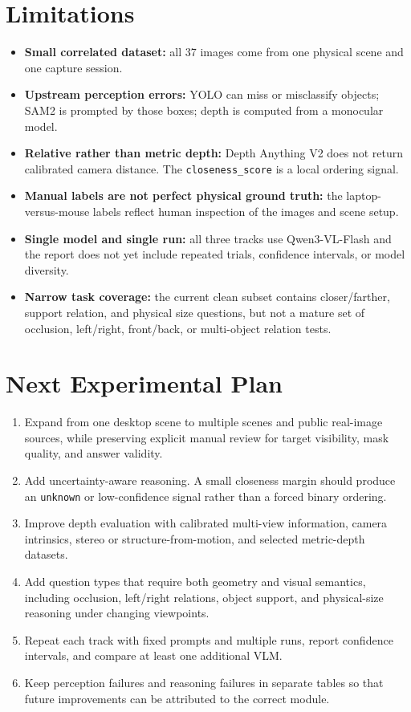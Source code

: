 \documentclass[11pt]{article}
\begin{document}
\section{Limitations}
\begin{itemize}[leftmargin=18pt,itemsep=2pt]
    \item \textbf{Small correlated dataset:} all 37 images come from one physical scene and one capture session.
    \item \textbf{Upstream perception errors:} YOLO can miss or misclassify objects; SAM2 is prompted by those boxes; depth is computed from a monocular model.
    \item \textbf{Relative rather than metric depth:} Depth Anything V2 does not return calibrated camera distance. The \texttt{closeness\_score} is a local ordering signal.
    \item \textbf{Manual labels are not perfect physical ground truth:} the laptop-versus-mouse labels reflect human inspection of the images and scene setup.
    \item \textbf{Single model and single run:} all three tracks use Qwen3-VL-Flash and the report does not yet include repeated trials, confidence intervals, or model diversity.
    \item \textbf{Narrow task coverage:} the current clean subset contains closer/farther, support relation, and physical size questions, but not a mature set of occlusion, left/right, front/back, or multi-object relation tests.
\end{itemize}

\section{Next Experimental Plan}
\begin{enumerate}[leftmargin=18pt,itemsep=2pt]
    \item Expand from one desktop scene to multiple scenes and public real-image sources, while preserving explicit manual review for target visibility, mask quality, and answer validity.
    \item Add uncertainty-aware reasoning. A small closeness margin should produce an \texttt{unknown} or low-confidence signal rather than a forced binary ordering.
    \item Improve depth evaluation with calibrated multi-view information, camera intrinsics, stereo or structure-from-motion, and selected metric-depth datasets.
    \item Add question types that require both geometry and visual semantics, including occlusion, left/right relations, object support, and physical-size reasoning under changing viewpoints.
    \item Repeat each track with fixed prompts and multiple runs, report confidence intervals, and compare at least one additional VLM.
    \item Keep perception failures and reasoning failures in separate tables so that future improvements can be attributed to the correct module.
\end{enumerate}
\end{document}
